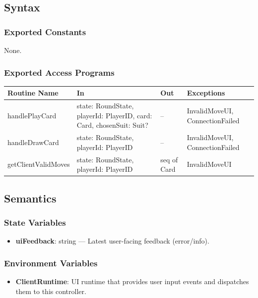 \documentclass[12pt, titlepage]{article}
\begin{document}
\subsection{Syntax}

\subsubsection{Exported Constants}
None.

\subsubsection{Exported Access Programs}

\begin{center}
    \begin{tabular}{p{4cm} p{5cm} p{3cm} p{3.5cm}}
        \toprule
        \textbf{Routine Name} & \textbf{In} & \textbf{Out} & \textbf{Exceptions} \\
        \midrule
        handlePlayCard & state: RoundState, playerId: PlayerID, card: Card, chosenSuit: Suit? & -- & InvalidMoveUI, ConnectionFailed \\
        handleDrawCard & state: RoundState, playerId: PlayerID & -- & InvalidMoveUI, ConnectionFailed \\
        getClientValidMoves & state: RoundState, playerId: PlayerID & seq of Card & InvalidMoveUI \\
        \bottomrule
    \end{tabular}
\end{center}

\subsection{Semantics}

\subsubsection{State Variables}
\begin{itemize}
    \item \textbf{uiFeedback}: string --- Latest user-facing feedback (error/info).
\end{itemize}

\subsubsection{Environment Variables}
\begin{itemize}
    \item \textbf{ClientRuntime}: UI runtime that provides user input events and dispatches them to this controller.
\end{itemize}
\end{document}
